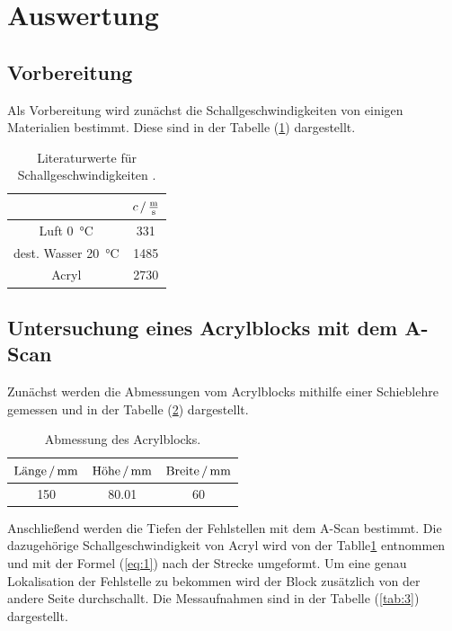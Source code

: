 \section{Auswertung}
\subsection{Vorbereitung}
Als Vorbereitung wird zunächst die Schallgeschwindigkeiten von einigen Materialien bestimmt. Diese sind in
der Tabelle (\ref{tab:1}) dargestellt.
\begin{table}[H]
  \centering
  \caption{Literaturwerte für Schallgeschwindigkeiten \cite{2} \cite{3}.}
  \label{tab:1}
  \begin{tabular}{c c}
    \toprule
     & $c \, / \, \si[per-mode=fraction]{\meter\per\second}$\\
     \midrule
     Luft \SI{0}{\celsius}          & 331  \\
     dest. Wasser \SI{20}{\celsius} & 1485 \\
     Acryl                          & 2730 \\
     \bottomrule
  \end{tabular}
\end{table}

\subsection{Untersuchung eines Acrylblocks mit dem A-Scan}
Zunächst werden die Abmessungen vom Acrylblocks mithilfe einer Schieblehre gemessen und in
der Tabelle (\ref{tab:2}) dargestellt.

\begin{table}[H]
  \centering
  \caption{Abmessung des Acrylblocks.}
  \label{tab:2}
  \begin{tabular}{c c c}
    \toprule
     $\text{Länge} \,/\, \si[per-mode=fraction]{\milli\meter}$ &$\text{Höhe} \, /\, \si[per-mode=fraction]{\milli\meter}$ &$\text{Breite} \, /\, \si[per-mode=fraction]{\milli\meter}$\\
     \midrule
     150 & 80.01 & 60 \\
     \bottomrule
  \end{tabular}
\end{table}

Anschließend werden die Tiefen der Fehlstellen mit dem A-Scan bestimmt. Die dazugehörige Schallgeschwindigkeit
von Acryl wird von der Tablle{\ref{tab:1}} entnommen und mit der Formel (\ref{eq:1}) nach der Strecke umgeformt.
Um eine genau Lokalisation der Fehlstelle zu bekommen wird der Block zusätzlich von der andere Seite durchschallt.
Die Messaufnahmen sind in der Tabelle (\ref{tab:3}) dargestellt.

